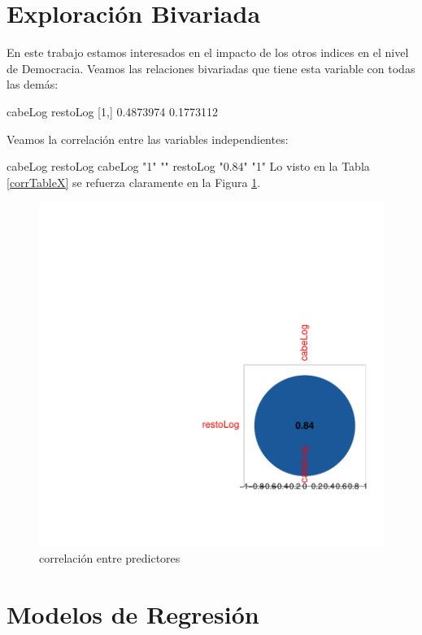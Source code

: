\documentclass{article}
\begin{document}
\section{Exploraci\'on Bivariada}

En este trabajo estamos interesados en el impacto de los otros indices en el nivel de Democracia. Veamos las relaciones bivariadas que tiene esta variable con todas las dem\'as:

       cabeLog  restoLog
[1,] 0.4873974 0.1773112

Veamos la correlaci\'on entre las variables independientes:


         cabeLog restoLog
cabeLog  "1"     ""      
restoLog "0.84"  "1"     
Lo visto en la Tabla \ref{corrTableX} se refuerza claramente en la Figura \ref{corrPlotX}.

\begin{figure}[h]
\centering
\begin{adjustbox}{width=7cm,height=7cm,clip,trim=1.5cm 0.5cm 0cm 1.5cm}

\includegraphics{FinaldeR2-corrPlotX}
\end{adjustbox}
\caption{correlaci\'on entre predictores}
\label{corrPlotX}
\end{figure}


\clearpage

\section{Modelos de Regresi\'on}
\end{document}

